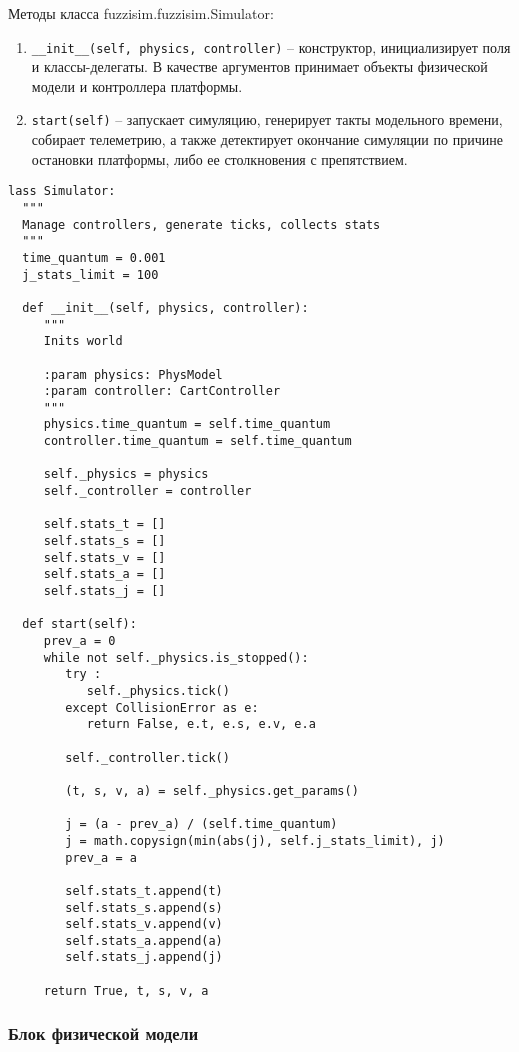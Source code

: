 Методы класса fuzzisim.fuzzisim.Simulator:
\begin{enumerate}[label=\arabic*)]
  \item \lstinline!__init__(self, physics, controller)! – конструктор, инициализирует поля и классы-делегаты. В качестве аргументов принимает объекты физической модели и контроллера платформы.
  \item \lstinline!start(self)! – запускает симуляцию, генерирует такты модельного времени, собирает телеметрию, а также детектирует окончание симуляции по причине остановки платформы, либо ее столкновения с препятствием.
\end{enumerate}

\begin{lstlisting}[style=pythonstyle,caption={  }, label=lst:func:1]
lass Simulator:
  """
  Manage controllers, generate ticks, collects stats
  """
  time_quantum = 0.001
  j_stats_limit = 100

  def __init__(self, physics, controller):
     """
     Inits world

     :param physics: PhysModel
     :param controller: CartController
     """
     physics.time_quantum = self.time_quantum
     controller.time_quantum = self.time_quantum

     self._physics = physics
     self._controller = controller

     self.stats_t = []
     self.stats_s = []
     self.stats_v = []
     self.stats_a = []
     self.stats_j = []

  def start(self):
     prev_a = 0
     while not self._physics.is_stopped():
        try :
           self._physics.tick()
        except CollisionError as e:
           return False, e.t, e.s, e.v, e.a

        self._controller.tick()

        (t, s, v, a) = self._physics.get_params()

        j = (a - prev_a) / (self.time_quantum)
        j = math.copysign(min(abs(j), self.j_stats_limit), j)
        prev_a = a

        self.stats_t.append(t)
        self.stats_s.append(s)
        self.stats_v.append(v)
        self.stats_a.append(a)
        self.stats_j.append(j)

     return True, t, s, v, a
\end{lstlisting}

\subsubsection{Блок физической модели}

